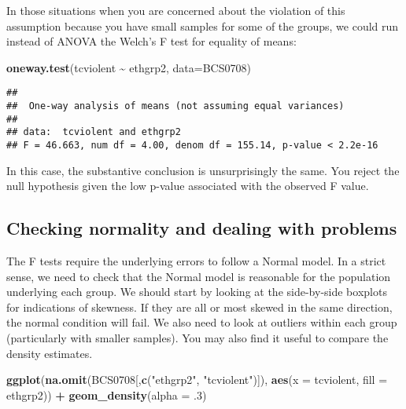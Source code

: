 \documentclass[
]{book}
\newenvironment{Shaded}{\begin{snugshade}}{\end{snugshade}}
\newcommand{\AttributeTok}[1]{\textcolor[rgb]{0.13,0.29,0.53}{#1}}
\newcommand{\DecValTok}[1]{\textcolor[rgb]{0.00,0.00,0.81}{#1}}
\newcommand{\FunctionTok}[1]{\textcolor[rgb]{0.13,0.29,0.53}{\textbf{#1}}}
\newcommand{\NormalTok}[1]{#1}
\newcommand{\SpecialCharTok}[1]{\textcolor[rgb]{0.81,0.36,0.00}{\textbf{#1}}}
\newcommand{\StringTok}[1]{\textcolor[rgb]{0.31,0.60,0.02}{#1}}
\begin{document}
In those situations when you are concerned about the violation of this assumption because you have small samples for some of the groups, we could run instead of ANOVA the Welch's F test for equality of means:

\begin{Shaded}
\begin{Highlighting}[]
\FunctionTok{oneway.test}\NormalTok{(tcviolent }\SpecialCharTok{\textasciitilde{}}\NormalTok{ ethgrp2, }\AttributeTok{data=}\NormalTok{BCS0708)}
\end{Highlighting}
\end{Shaded}

\begin{verbatim}
## 
##  One-way analysis of means (not assuming equal variances)
## 
## data:  tcviolent and ethgrp2
## F = 46.663, num df = 4.00, denom df = 155.14, p-value < 2.2e-16
\end{verbatim}

In this case, the substantive conclusion is unsurprisingly the same. You reject the null hypothesis given the low p-value associated with the observed F value.

\subsection{Checking normality and dealing with problems}\label{checking-normality-and-dealing-with-problems}

The F tests require the underlying errors to follow a Normal model. In a strict sense, we need to check that the Normal model is reasonable for the population underlying each group. We should start by looking at the side-by-side boxplots for indications of skewness. If they are all or most skewed in the same direction, the normal condition will fail. We also need to look at outliers within each group (particularly with smaller samples). You may also find it useful to compare the density estimates.

\begin{Shaded}
\begin{Highlighting}[]
\FunctionTok{ggplot}\NormalTok{(}\FunctionTok{na.omit}\NormalTok{(BCS0708[,}\FunctionTok{c}\NormalTok{(}\StringTok{"ethgrp2"}\NormalTok{, }\StringTok{"tcviolent"}\NormalTok{)]), }\FunctionTok{aes}\NormalTok{(}\AttributeTok{x =}\NormalTok{ tcviolent, }\AttributeTok{fill =}\NormalTok{ ethgrp2)) }\SpecialCharTok{+} 
  \FunctionTok{geom\_density}\NormalTok{(}\AttributeTok{alpha =}\NormalTok{ .}\DecValTok{3}\NormalTok{)}
\end{Highlighting}
\end{Shaded}
\end{document}
